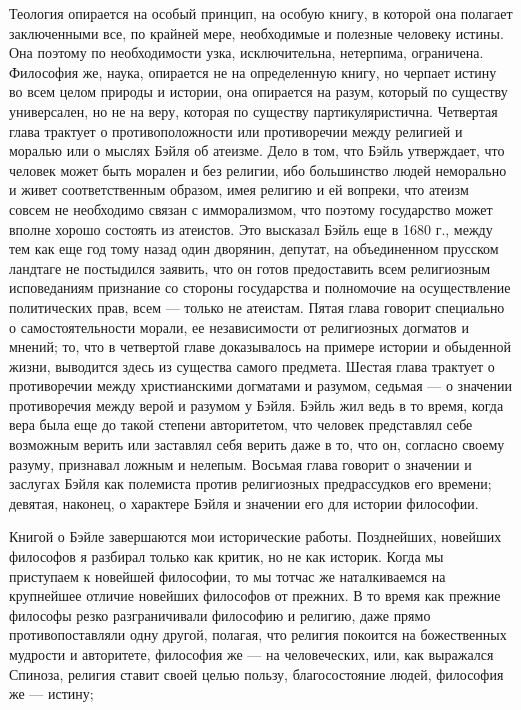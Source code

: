 \documentclass[12pt]{article}
\begin{document}
Теология опирается на особый принцип, на особую книгу, в которой она полагает заключенными все, по крайней мере, необходимые и полезные человеку истины. Она поэтому по необходимости узка, исключительна, нетерпима, ограничена. Философия же, наука, опирается не на определенную книгу, но черпает истину во всем целом природы и истории, она опирается на разум, который по существу универсален, но не на веру, которая по существу партикуляристична. Четвертая глава трактует о противоположности или противоречии между религией и моралью или о мыслях Бэйля об атеизме. Дело в том, что Бэйль утверждает, что человек может быть морален и без религии, ибо большинство людей неморально и живет соответственным образом, имея религию и ей вопреки, что атеизм совсем не необходимо связан с имморализмом, что поэтому государство может вполне хорошо состоять из атеистов. Это высказал Бэйль еще в 1680 г., между тем как еще год тому назад один дворянин, депутат, на объединенном прусском ландтаге не постыдился заявить, что он готов предоставить всем религиозным исповеданиям признание со стороны государства и полномочие на осуществление политических прав, всем --- только не атеистам. Пятая глава говорит специально о самостоятельности морали, ее независимости от религиозных догматов и мнений; то, что в четвертой главе доказывалось на примере истории и обыденной жизни, выводится здесь из существа самого предмета. Шестая глава трактует о противоречии между христианскими догматами и разумом, седьмая --- о значении противоречия между верой и разумом у Бэйля. Бэйль жил ведь в то время, когда вера была еще до такой степени авторитетом, что человек представлял себе возможным верить или заставлял себя верить даже в то, что он, согласно своему разуму, признавал ложным и нелепым. Восьмая глава говорит о значении и заслугах Бэйля как полемиста против религиозных предрассудков его времени; девятая, наконец, о характере Бэйля и значении его для истории философии. 

Книгой о Бэйле завершаются мои исторические работы. Позднейших, новейших философов я разбирал только как критик, но не как историк. Когда мы приступаем к новейшей философии, то мы тотчас же наталкиваемся на крупнейшее отличие новейших философов от прежних. В то время как прежние философы резко разграничивали философию и религию, даже прямо противопоставляли одну другой, полагая, что религия покоится на божественных мудрости и авторитете, философия же --- на человеческих, или, как выражался Спиноза, религия ставит своей целью пользу, благосостояние людей, философия же --- истину; 
\end{document}
